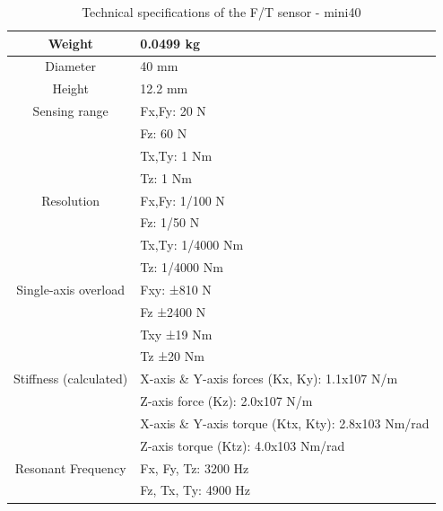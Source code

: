 \begin{table}[htbp]
\centering
\tabcolsep=10pt
\arrayrulewidth=1pt
\caption{Technical specifications of the F/T sensor - mini40}
\label{tab:mini40_specification}
\par
\begin{tabular}{|>{\columncolor{lightgray!20}}c|l|} 
\hline
Weight										&0.0499 kg	\\  \hline
Diameter									&40 mm  	\\ 	\hline
Height										&12.2 mm 	\\	\hline
\multirow{4}{*}{}Sensing range					&Fx,Fy: 20 N\\
											&Fz: 60 N\\
											&Tx,Ty: 1 Nm\\	
											&Tz: 1 Nm\\	\hline
\multirow{4}{*}{}Resolution						&Fx,Fy: 1/100 N	\\
											&Fz: 1/50 N\\
											&Tx,Ty: 1/4000 Nm\\	
											&Tz: 1/4000 Nm\\	\hline										
\multirow{4}{*}{}Single-axis overload 			&Fxy: ±810 N  \\	
											&Fz	±2400 N  \\
											&Txy	±19 Nm  \\
											&Tz	±20 Nm  \\ \hline
\multirow{4}{*}{}Stiffness (calculated)   		&X-axis \& Y-axis forces (Kx, Ky): 1.1x107 N/m   \\	
											&Z-axis force (Kz): 2.0x107 N/m   \\	
											&X-axis \& Y-axis torque (Ktx, Kty): 2.8x103 Nm/rad   \\	
											&Z-axis torque (Ktz): 4.0x103 Nm/rad   \\	 \hline
\multirow{2}{*}{}Resonant Frequency 			&Fx, Fy, Tz: 3200 Hz  \\
											&Fz, Tx, Ty: 4900 Hz  \\
\hline
\end{tabular}
\end{table}

\newpage
